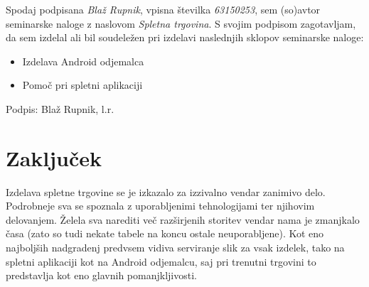 \documentclass[a4paper,12pt]{report}
\newcommand{\naslov}     {Spletna trgovina}
\newcommand{\drugiavtor} {Blaž Rupnik}
\newcommand{\drugiindeks}{63150253}
\begin{document}
\newpage

Spodaj podpisana \textit{\drugiavtor}, vpisna številka \textit{\drugiindeks}, sem (so)avtor seminarske naloge z naslovom \textit{\naslov}. S svojim podpisom zagotavljam, da sem izdelal ali bil soudeležen pri izdelavi naslednjih sklopov seminarske naloge:
\begin{itemize}
    \item Izdelava Android odjemalca
    \item Pomoč pri spletni aplikaciji
\end{itemize}

Podpis: {\drugiavtor}, l.r.

\chapter{Zaključek}

Izdelava spletne trgovine se je izkazalo za izzivalno vendar zanimivo delo. Podrobneje sva se spoznala z uporabljenimi tehnologijami ter njihovim delovanjem. Želela sva narediti več razširjenih storitev vendar nama je zmanjkalo časa (zato so tudi nekate tabele na koncu ostale neuporabljene). Kot eno najboljših nadgradenj predvsem vidiva serviranje slik za vsak izdelek, tako na spletni aplikaciji kot na Android odjemalcu, saj pri trenutni trgovini to predstavlja kot eno glavnih pomanjkljivosti.
\end{document}

